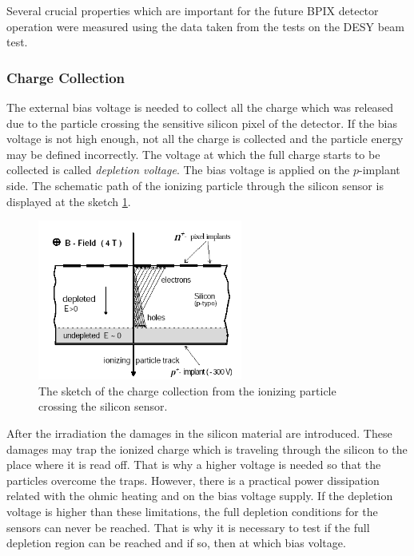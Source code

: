 Several crucial properties which are important for the future BPIX detector operation were measured using the data taken from the 
tests on the DESY beam test.

\subsubsection{Charge Collection}

The external bias voltage is needed to collect all the charge which was released due to the particle crossing the sensitive silicon
pixel of the detector. If the bias voltage is not high enough, not all the charge is collected and the particle energy may be defined
incorrectly. The voltage at which the full charge starts to be collected is called \textit{depletion voltage}. The bias voltage is
applied on the $p$-implant side. The schematic path of the ionizing particle through the silicon sensor is displayed at the sketch \ref{fig:depl_volt}.

\begin{figure}[h]
 \centering
 \includegraphics[width=0.6\textwidth]{021_pixel_upgrade/plots/depletion_voltage.png}
 \caption{The sketch of the charge collection from the ionizing particle crossing the silicon sensor.}
 \label{fig:depl_volt}
\end{figure}

After the irradiation the damages in the silicon material are introduced. These damages may trap the ionized charge  which is traveling 
through the silicon to the place where it is read off. That is why a higher voltage is needed so that the particles overcome the traps.
However, there is a practical power dissipation related with the ohmic heating and on the bias voltage supply. If the depletion voltage
is higher than these limitations, the full depletion conditions for the sensors can never be reached. That is why it is necessary to test
if the full depletion region can be reached and if so, then at which bias voltage.


